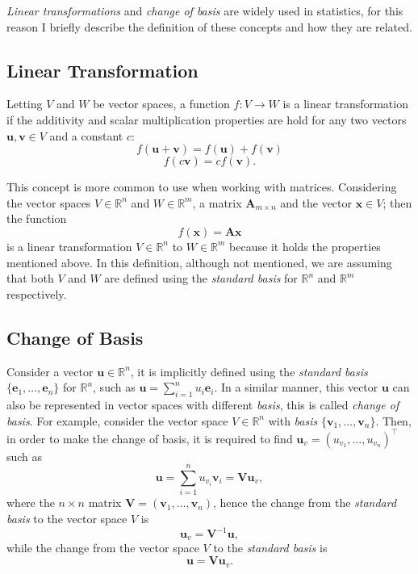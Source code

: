 \documentclass[]{book}
\begin{document}
\newcommand{\real}{\mathbb{R}}

\newcommand{\df}[1]{\mathcal{#1}}

\newcommand{\logit}[1]{\text{logit}\left(#1\right)}

\newcommand{\key}[1]{\textbf{#1}}
\newcommand{\page}[1]{page #1}
\newcommand{\mypar}[1]{\noindent \textbf{#1}}
\newcommand{\degrees}{^{\circ}}
\newcommand{\eq}{\text{Equation }}
\newcommand{\se}{\text{Section }}

\emph{Linear transformations} and \emph{change of basis} are widely used in statistics, for this
reason I briefly describe the definition of these concepts and how they are related.

\hypertarget{linear-transformation}{%
\subsection{Linear Transformation}\label{linear-transformation}}

Letting \(V\) and \(W\) be vector spaces, a function \(f: V \rightarrow W\) is a linear
transformation if the additivity and scalar multiplication properties are hold for
any two vectors \(\mathbf{u}, \mathbf{v} \in V\) and a constant \(c\):
\[f(\mathbf{u}+\mathbf{v}) = f(\mathbf{u}) + f(\mathbf{v})\]
\[f(c\mathbf{v}) = cf(\mathbf{v}).\]

This concept is more common to use when working with matrices. Considering the
vector spaces \(V \in \mathbb{R}^n\) and \(W \in \mathbb{R}^m\), a matrix \(\mathbf{A}_{m \times n}\) and
the vector \(\mathbf{x} \in V\); then the function
\[f(\mathbf{x}) = \mathbf{A}\mathbf{x}\]
is a linear
transformation \(V \in \mathbb{R}^n\) to \(W \in \mathbb{R}^m\) because it holds the properties
mentioned above. In this definition, although not mentioned, we are assuming that both
\(V\) and \(W\) are defined using the \emph{standard basis} for \(\mathbb{R}^n\) and \(\mathbb{R}^m\)
respectively.

\hypertarget{change-of-basis}{%
\subsection{Change of Basis}\label{change-of-basis}}

Consider a vector \(\mathbf{u} \in \mathbb{R}^n\), it is implicitly defined using the
\emph{standard basis} \(\{\mathbf{e}_1,\dots,\mathbf{e}_n\}\) for \(\mathbb{R}^n\), such as
\(\mathbf{u}=\sum_{i=1}^n u_i \mathbf{e}_i\). In a similar manner, this vector \(\mathbf{u}\) can
also be represented in vector spaces with different \emph{basis}, this is called
\emph{change of basis}. For example, consider
the vector space \(V \in \mathbb{R}^n\) with \emph{basis} \(\{\mathbf{v}_1,\dots,\mathbf{v}_n\}\). Then, in
order to make the change of basis, it is required to find
\(\mathbf{u}_v=(u_{v_1},\dots,u_{v_n})^\intercal\) such as
\[\mathbf{u} = \sum_{i=1}^n u_{v_i} \mathbf{v}_i = \mathbf{V}\mathbf{u}_v,\]
where the \(n\times n\) matrix \(\mathbf{V}=(\mathbf{v}_1,\dots,\mathbf{v}_n)\), hence the change from
the \emph{standard basis} to the vector space \(V\) is
\[\mathbf{u}_v = \mathbf{V}^{-1}\mathbf{u},\] while the change from the vector space \(V\) to the
\emph{standard basis} is
\[\mathbf{u} = \mathbf{V}\mathbf{u}_v.\]
\end{document}
